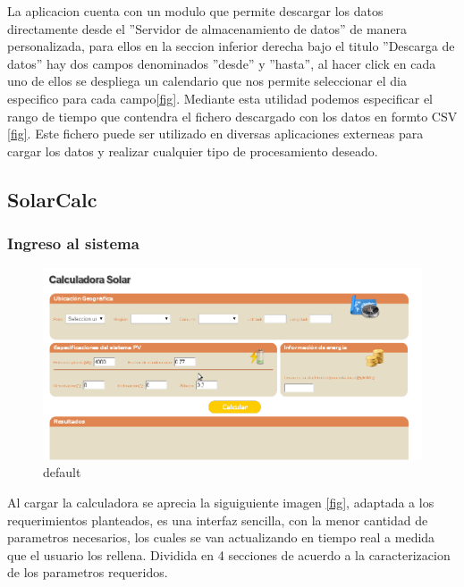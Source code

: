 La aplicacion cuenta con un modulo que permite descargar los datos directamente desde el ''Servidor de almacenamiento de datos'' de manera personalizada, para ellos en la seccion inferior derecha bajo el titulo ''Descarga de datos'' hay dos campos denominados ''desde'' y ''hasta'', al hacer click en cada uno de ellos se despliega un calendario que nos permite seleccionar el dia especifico para cada campo\ref{fig}. Mediante esta utilidad podemos especificar el rango de tiempo que contendra el fichero descargado con los datos en formto CSV \ref{fig}. Este fichero puede ser utilizado en diversas aplicaciones externeas para cargar los datos y realizar cualquier tipo de procesamiento deseado.

\clearpage 
\subsection{SolarCalc}
\subsubsection{Ingreso al sistema}
\begin{figure}[ht]
        \centering
        \includegraphics[width=\textwidth]{./images/cap5chap1img6}
        \caption{default}
        \label{fig:figure1}
\end{figure}
Al cargar la calculadora se aprecia la siguiguiente imagen \ref{fig}, adaptada a los requerimientos planteados, es una interfaz sencilla, con la menor cantidad de parametros necesarios, los cuales se van actualizando en tiempo real a medida que el usuario los rellena. Dividida en 4 secciones de acuerdo a la caracterizacion de los parametros requeridos.

